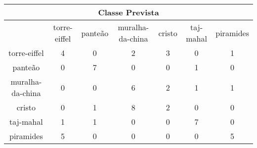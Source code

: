 \begin{tabular}{|c|c|c|c|c|c|c|}
\hline
\multicolumn{7}{|c|}{Classe Prevista}\\
\hline
 & torre-eiffel & panteão & muralha-da-china & cristo & taj-mahal & piramides\\
torre-eiffel & 4 & 0 & 2 & 3 & 0 & 1\\
panteão & 0 & 7 & 0 & 0 & 1 & 0\\
muralha-da-china & 0 & 0 & 6 & 2 & 1 & 1\\
cristo & 0 & 1 & 8 & 2 & 0 & 0\\
taj-mahal & 1 & 1 & 0 & 0 & 7 & 0\\
piramides & 5 & 0 & 0 & 0 & 0 & 5\\
\hline
\end{tabular}
